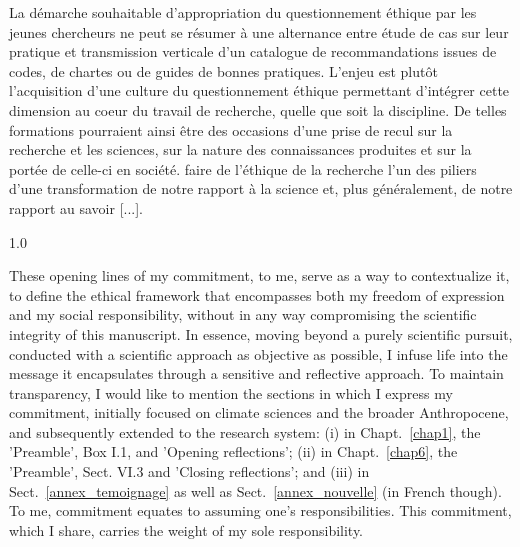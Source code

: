 {\begin{minipage}{0.85\textwidth}
{{\newline \indent
[...]
\newline \indent
La démarche souhaitable d’appropriation du questionnement éthique par les jeunes chercheurs ne peut se résumer à une alternance entre étude de cas sur leur pratique et transmission verticale d’un catalogue de recommandations issues de codes, de chartes ou de guides de bonnes pratiques. L’enjeu est plutôt l’acquisition d’une culture du questionnement éthique permettant d’intégrer cette dimension au coeur du travail de recherche, quelle que soit la discipline.
\newline \indent
[...]
\newline \indent
De telles formations pourraient ainsi être des occasions d’une prise de recul sur la recherche et les sciences, sur la nature des connaissances produites et sur la portée de celle-ci en société.
\newline \indent
[...]
\newline \indent
faire de l’éthique de la recherche l’un des piliers d’une transformation de notre rapport à la science et, plus généralement, de notre rapport au savoir [...].}
}
\end{minipage}}

\begin{spacing}{1.0}
~
\end{spacing}

These opening lines of my commitment, to me, serve as a way to contextualize it, to define the ethical framework that encompasses both my freedom of expression and my social responsibility, without in any way compromising the scientific integrity of this manuscript. In essence, moving beyond a purely scientific pursuit, conducted with a scientific approach as objective as possible, I infuse life into the message it encapsulates through a sensitive and reflective approach. To maintain transparency, I would like to mention the sections in which I express my commitment, initially focused on climate sciences and the broader Anthropocene, and subsequently extended to the research system: (i) in Chapt.~\ref{chap1}, the 'Preamble', Box I.1, and 'Opening reflections'; (ii) in Chapt.~\ref{chap6}, the 'Preamble', Sect. VI.3 and 'Closing reflections'; and (iii) in Sect.~\ref{annex_temoignage} as well as Sect.~\ref{annex_nouvelle} (in French though). To me, commitment equates to assuming one's responsibilities. This commitment, which I share, carries the weight of my sole responsibility.
\\





